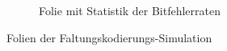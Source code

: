 \begin{figure}[th]
	\par\bigskip
	\begin{subfigure}{0.48\textwidth}
		\centering
		\caption{Folie mit Statistik der Bitfehlerraten}
		\label{abb:folie_simulation_f3}
	\end{subfigure}
	\caption{Folien der Faltungskodierungs-Simulation}
	\label{abb:folie_simulation_f}
\end{figure}

